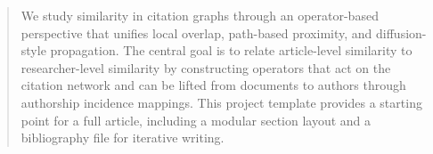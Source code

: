 \begin{abstract}
We study similarity in citation graphs through an operator-based perspective that unifies
local overlap, path-based proximity, and diffusion-style propagation. The central goal is
to relate article-level similarity to researcher-level similarity by constructing operators
that act on the citation network and can be lifted from documents to authors through
authorship incidence mappings. This project template provides a starting point for a full
article, including a modular section layout and a bibliography file for iterative writing.
\end{abstract}
